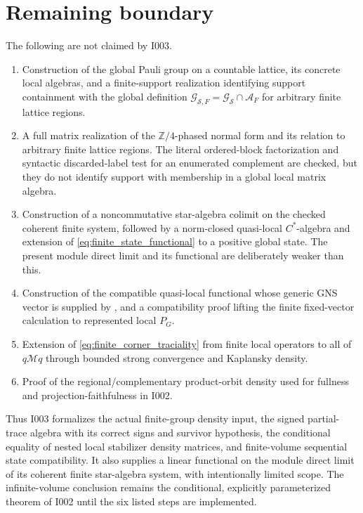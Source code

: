 \documentclass[11pt,reqno]{amsart}
\numberwithin{equation}{section}
\theoremstyle{definition}
\theoremstyle{remark}
\newcommand{\cA}{\mathcal A}
\newcommand{\cM}{\mathcal M}
\newcommand{\cG}{\mathcal G}
\newcommand{\cS}{\mathcal S}
\begin{document}
\section{Remaining boundary}
\label{sec:boundary}

The following are not claimed by I003.
\begin{enumerate}[leftmargin=2.2em]
  \item Construction of the global Pauli group on a countable lattice, its
  concrete local algebras, and a finite-support realization identifying
  support containment with the global definition
  $\cG_{\cS,F}=\cG_{\cS}\cap\cA_F$ for arbitrary finite lattice regions.
  \item A full matrix realization of the $\mathbb Z/4$-phased normal form and
  its relation to arbitrary finite lattice regions.  The literal ordered-block
  factorization and syntactic discarded-label test for an enumerated complement
  are checked, but they do not identify support with membership in a global
  local matrix algebra.
  \item Construction of a noncommutative star-algebra colimit on the checked
  coherent finite system, followed by a norm-closed quasi-local $C^*$-algebra
  and extension of \eqref{eq:finite_state_functional} to a positive global
  state.  The present module direct limit and its functional are deliberately
  weaker than this.
  \item Construction of the compatible quasi-local functional whose generic
  GNS vector is supplied by , and a compatibility proof
  lifting the finite  fixed-vector calculation to
  represented local $P_G$.
  \item Extension of \eqref{eq:finite_corner_traciality} from finite local
  operators to all of $q\cM q$ through bounded strong convergence and
  Kaplansky density.
  \item Proof of the regional/complementary product-orbit density used for
  fullness and projection-faithfulness in I002.
\end{enumerate}

Thus I003 formalizes the actual finite-group density input, the signed
partial-trace algebra with its correct signs and survivor hypothesis, the
conditional equality of nested local stabilizer density matrices, and
finite-volume sequential state compatibility.  It also supplies a linear
functional on the module direct limit of its coherent finite star-algebra
system, with intentionally limited scope.  The infinite-volume conclusion
remains the conditional, explicitly parameterized theorem of I002 until the
six listed steps are implemented.
\end{document}
